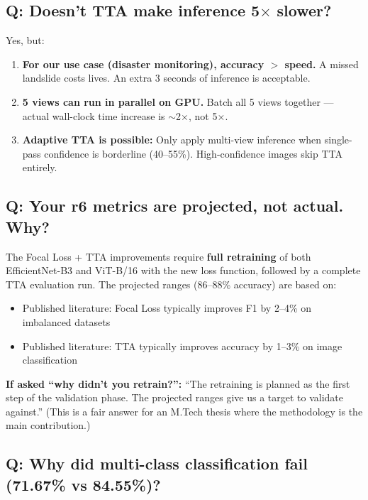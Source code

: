 \documentclass[11pt]{article}
\begin{document}
\subsection{Q: Doesn't TTA make inference 5$\times$ slower?}

Yes, but:
\begin{enumerate}[noitemsep]
    \item \textbf{For our use case (disaster monitoring), accuracy $>$ speed.} A missed landslide costs lives. An extra 3 seconds of inference is acceptable.
    \item \textbf{5 views can run in parallel on GPU.} Batch all 5 views together --- actual wall-clock time increase is $\sim$2$\times$, not 5$\times$.
    \item \textbf{Adaptive TTA is possible:} Only apply multi-view inference when single-pass confidence is borderline (40--55\%). High-confidence images skip TTA entirely.
\end{enumerate}

\subsection{Q: Your r6 metrics are projected, not actual. Why?}

The Focal Loss + TTA improvements require \textbf{full retraining} of both EfficientNet-B3 and ViT-B/16 with the new loss function, followed by a complete TTA evaluation run. The projected ranges (86--88\% accuracy) are based on:

\begin{itemize}[noitemsep]
    \item Published literature: Focal Loss typically improves F1 by 2--4\% on imbalanced datasets
    \item Published literature: TTA typically improves accuracy by 1--3\% on image classification
\end{itemize}

\textbf{If asked ``why didn't you retrain?'':} ``The retraining is planned as the first step of the validation phase. The projected ranges give us a target to validate against.'' (This is a fair answer for an M.Tech thesis where the methodology is the main contribution.)

\subsection{Q: Why did multi-class classification fail (71.67\% vs 84.55\%)?}
\end{document}

